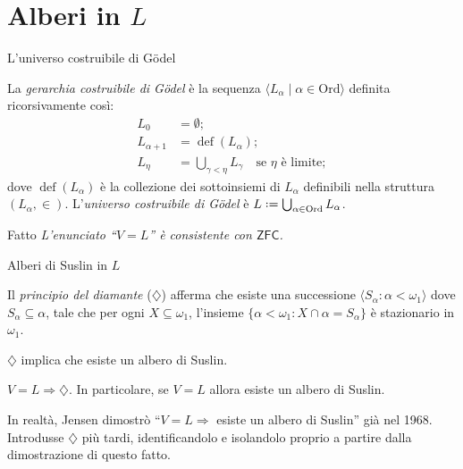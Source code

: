 \documentclass{beamer}
\theoremstyle{num.custom-title}
\theoremstyle{custom-title}
\DeclareMathOperator{\imp}{\Rightarrow}
\DeclareMathOperator{\sse}{\subseteq}
\newcommand{\ZFC}{\ensuremath{\mathsf{ZFC}}\xspace}
\newcommand{\Ord}{\mathrm{Ord}}
\newcommand*{\defeq}{\mathrel{\rlap{%
                     \raisebox{0.3ex}{$\cdot$}}%
                     \raisebox{-0.3ex}{$\cdot$}}%
                     =}
\begin{document}
\section{Alberi in $L$}


\begin{frame}{L'universo costruibile di Gödel}

\begin{definition}
La \emph{gerarchia costruibile di Gödel} è la sequenza $\langle L_\alpha \mid \alpha \in \Ord \rangle$ definita ricorsivamente così:
\begin{align*}
L_0 &= \emptyset;\\
L_{\alpha+1} &= \operatorname{def}(L_\alpha);\\
L_{\eta} &= \bigcup_{\gamma < \eta} L_\gamma \quad \text{se $\eta$ è limite};
\end{align*}
dove $\operatorname{def}(L_\alpha)$ è la collezione dei sottoinsiemi di $L_\alpha$ definibili nella struttura $(L_\alpha,\in)$. L'\emph{universo costruibile di Gödel} è $L \defeq \bigcup_{\alpha \in \Ord} L_\alpha$.
\end{definition}

\begin{block}{Fatto}
\textit{L'enunciato ``$V=L$'' è consistente con \ZFC.}
\end{block}

\end{frame}


\begin{frame}{Alberi di Suslin in $L$}

\vspace{5pt}

\begin{definition}
Il \emph{principio del diamante} ($\diamondsuit$) afferma che esiste una successione $\langle S_\alpha : \alpha < \omega_1 \rangle$ dove $S_\alpha \sse \alpha$, tale che per ogni $X \sse \omega_1$, l'insieme $\{\alpha < \omega_1 : X \cap \alpha = S_\alpha \}$ è stazionario in $\omega_1$.
\end{definition}

\pause

\begin{theorem}[Jensen, 1971]
$\diamondsuit$ implica che esiste un albero di Suslin.
\end{theorem}

\pause

\begin{theorem}[Jensen, 1971]
$V=L \imp \diamondsuit$. In particolare, se $V=L$ allora esiste un albero di Suslin.
\end{theorem}

\pause

In realtà, Jensen dimostrò ``$V=L \imp$ esiste un albero di Suslin'' già nel 1968. Introdusse $\diamondsuit$ più tardi, identificandolo e isolandolo proprio a partire dalla dimostrazione di questo fatto.

\end{frame}
\end{document}
